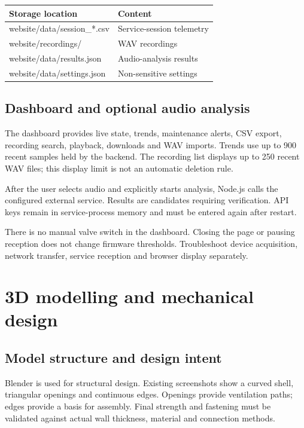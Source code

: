 \documentclass[10pt,a4paper]{article}
\begin{document}
\begin{longtable}{>{\raggedright\arraybackslash}p{54mm}>{\raggedright\arraybackslash}p{111mm}}
\toprule
\textbf{Storage location} & \textbf{Content}\\\midrule\endhead
website/data/session\_*.csv & Service-session telemetry\\
website/recordings/ & WAV recordings\\
website/data/results.json & Audio-analysis results\\
website/data/settings.json & Non-sensitive settings\\
\bottomrule\end{longtable}

\subsection{Dashboard and optional audio analysis}

The dashboard provides live state, trends, maintenance alerts, CSV export, recording search, playback, downloads and WAV imports. Trends use up to 900 recent samples held by the backend. The recording list displays up to 250 recent WAV files; this display limit is not an automatic deletion rule.


After the user selects audio and explicitly starts analysis, Node.js calls the configured external service. Results are candidates requiring verification. API keys remain in service-process memory and must be entered again after restart.


There is no manual valve switch in the dashboard. Closing the page or pausing reception does not change firmware thresholds. Troubleshoot device acquisition, network transfer, service reception and browser display separately.



\section{3D modelling and mechanical design}

\subsection{Model structure and design intent}

Blender is used for structural design. Existing screenshots show a curved shell, triangular openings and continuous edges. Openings provide ventilation paths; edges provide a basis for assembly. Final strength and fastening must be validated against actual wall thickness, material and connection methods.
\end{document}
